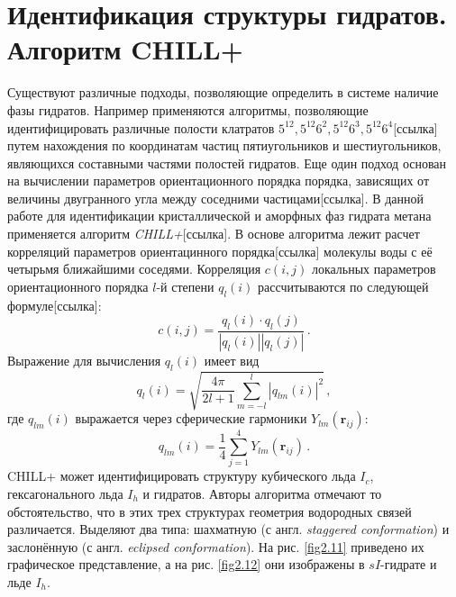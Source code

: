 \section{Идентификация структуры гидратов. Алгоритм CHILL+}
Существуют различные подходы, позволяющие определить в системе наличие фазы гидратов. Например применяются алгоритмы, позволяющие идентифицировать различные полости клатратов $5^{12}, 5^{12}6^2, 5^{12}6^3, 5^{12}6^4$[ссылка] путем нахождения по координатам частиц пятиугольников и шестиугольников, являющихся составными частями полостей гидратов. Еще один подход основан на вычислении параметров ориентационного порядка порядка, зависящих от величины двугранного угла между соседними частицами[ссылка]. В данной работе для идентификации кристаллической и аморфных фаз гидрата метана применяется алгоритм \textit{CHILL+}[ссылка]. В основе алгоритма лежит расчет корреляций параметров ориентацинного порядка[ссылка] молекулы воды с её четырьмя ближайшими соседями. Корреляция $c(i,j)$ локальных параметров ориентационного порядка $l$-й степени  $q_{l}(i)$ рассчитываются по следующей формуле[ссылка]:
\begin{equation}
    c(i,j) = \dfrac{q_l(i)\cdot q_l(j)}{|q_l(i)||q_l(j)|}\,.
    \label{eq2.16}
\end{equation}
Выражение для вычисления $q_{l}(i)$ имеет вид
\begin{equation}
    q_l(i)=\sqrt{\dfrac{4\pi}{2l+1}\sum\limits_{m=-l}^l{|q_{lm}(i)|}^2}\,,
    \label{eq2.17}
\end{equation}
где $q_{lm}(i)$ выражается через сферические гармоники $Y_{lm}(\mathbf{r}_{ij})$:
\begin{equation}
    q_{lm}(i) = \dfrac{1}{4}\sum\limits_{j=1}^4{Y_{lm}(\mathbf{r}_{ij})}\,.
    \label{eq2.18}
\end{equation}
CHILL+ может идентифицировать структуру кубического льда $I_c$, гексагонального льда $I_h$ и гидратов. Авторы алгоритма отмечают то обстоятельство, что в этих трех структурах геометрия водородных связей различается. Выделяют два типа: шахматную (с англ. \textit{staggered conformation}) и заслонённую (с англ. \textit{eclipsed conformation}). На рис. \ref{fig2.11} приведено их графическое представление, а на рис. \ref{fig2.12} они изображены в $sI$-гидрате и льде $I_h$.

